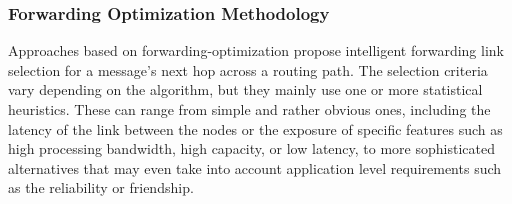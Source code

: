 %
%
%
%

\subsubsection{Forwarding Optimization Methodology}




Approaches based on forwarding-optimization 
propose intelligent forwarding link selection for a message's next
hop across a routing path. 
The selection criteria vary depending on the
algorithm, but they mainly use one or more statistical heuristics. 
These can range from simple and rather obvious ones, 
including the latency of the link between the nodes or
the exposure of specific features such as high processing bandwidth, high
capacity, or low latency, 
to more sophisticated alternatives that may even take
into account application level requirements such as 
the reliability or friendship. 

